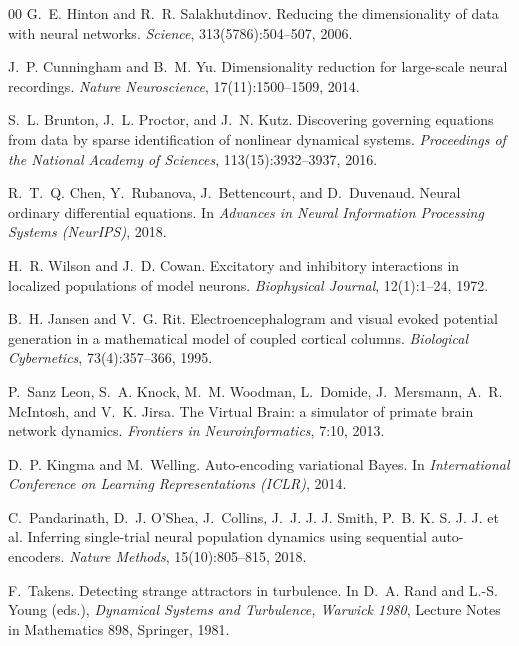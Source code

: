 \documentclass[5p,twocolumn,authoryear]{elsarticle}
\begin{document}
\begin{thebibliography}{00}
G.~E. Hinton and R.~R. Salakhutdinov.
\newblock Reducing the dimensionality of data with neural networks.
\newblock \emph{Science}, 313(5786):504--507, 2006.

J.~P. Cunningham and B.~M. Yu.
\newblock Dimensionality reduction for large-scale neural recordings.
\newblock \emph{Nature Neuroscience}, 17(11):1500--1509, 2014.

S.~L. Brunton, J.~L. Proctor, and J.~N. Kutz.
\newblock Discovering governing equations from data by sparse identification of nonlinear dynamical systems.
\newblock \emph{Proceedings of the National Academy of Sciences}, 113(15):3932--3937, 2016.

R.~T.~Q. Chen, Y.~Rubanova, J.~Bettencourt, and D.~Duvenaud.
\newblock Neural ordinary differential equations.
\newblock In \emph{Advances in Neural Information Processing Systems (NeurIPS)}, 2018.

H.~R. Wilson and J.~D. Cowan.
\newblock Excitatory and inhibitory interactions in localized populations of model neurons.
\newblock \emph{Biophysical Journal}, 12(1):1--24, 1972.

B.~H. Jansen and V.~G. Rit.
\newblock Electroencephalogram and visual evoked potential generation in a mathematical model of coupled cortical columns.
\newblock \emph{Biological Cybernetics}, 73(4):357--366, 1995.

P.~Sanz Leon, S.~A. Knock, M.~M. Woodman, L.~Domide, J.~Mersmann, A.~R. McIntosh, and V.~K. Jirsa.
\newblock The Virtual Brain: a simulator of primate brain network dynamics.
\newblock \emph{Frontiers in Neuroinformatics}, 7:10, 2013.

D.~P. Kingma and M.~Welling.
\newblock Auto-encoding variational Bayes.
\newblock In \emph{International Conference on Learning Representations (ICLR)}, 2014.

C.~Pandarinath, D.~J. O'Shea, J.~Collins, J.~J. J. J. Smith, P.~B. K. S. J. J. et al.
\newblock Inferring single-trial neural population dynamics using sequential auto-encoders.
\newblock \emph{Nature Methods}, 15(10):805--815, 2018.

F.~Takens.
\newblock Detecting strange attractors in turbulence.
\newblock In D.~A. Rand and L.-S. Young (eds.), \emph{Dynamical Systems and Turbulence, Warwick 1980}, Lecture Notes in Mathematics 898, Springer, 1981.


\end{thebibliography}
\end{document}
